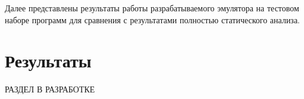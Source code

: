 \documentclass[utf8]{psta}%
\begin{document}
Далее представлены результаты работы разрабатываемого эмулятора на тестовом наборе программ для сравнения с результатами полностью статического анализа.
  
\section{Результаты}

РАЗДЕЛ В РАЗРАБОТКЕ
   

\section{}
\subsection{}


% 


\end{document}

